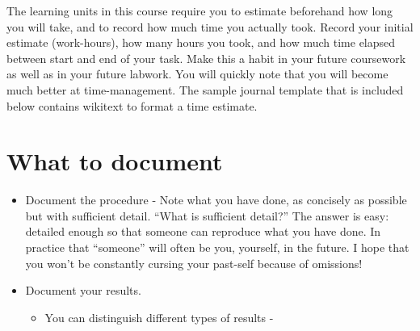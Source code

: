 \documentclass[]{book}
\providecommand{\tightlist}{%
  \setlength{\itemsep}{0pt}\setlength{\parskip}{0pt}}
\begin{document}
The learning units in this course require you to estimate beforehand how
long you will take, and to record how much time you actually took.
Record your initial estimate (work-hours), how many hours you took, and
how much time elapsed between start and end of your task. Make this a
habit in your future coursework as well as in your future labwork. You
will quickly note that you will become much better at time-management.
The sample journal template that is included below contains wikitext to
format a time estimate.

\section{What to document}\label{what-to-document}

\begin{itemize}
\tightlist
\item
  Document the procedure - Note what you have done, as concisely as
  possible but with sufficient detail. ``What is sufficient detail?''
  The answer is easy: detailed enough so that someone can reproduce what
  you have done. In practice that ``someone'' will often be you,
  yourself, in the future. I hope that you won't be constantly cursing
  your past-self because of omissions!
\item
  Document your results.

  \begin{itemize}
  \tightlist
  \item
    You can distinguish different types of results -
  \end{itemize}


\end{itemize}
\end{document}
